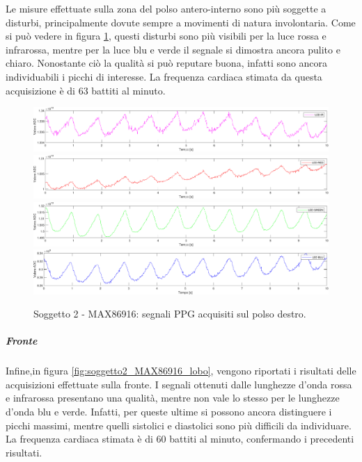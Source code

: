 Le misure effettuate sulla zona del polso antero-interno sono più soggette a disturbi, principalmente dovute sempre a movimenti di natura involontaria. Come si può vedere in figura \ref{fig:soggetto2_MAX86916_polso}, questi disturbi sono più visibili per la luce rossa e infrarossa, mentre per la luce blu e verde il segnale si dimostra ancora pulito e chiaro. Nonostante ciò la qualità si può reputare buona, infatti sono ancora individuabili i picchi di interesse. La frequenza cardiaca stimata da questa acquisizione è di 63 battiti al minuto.
\begin{figure}[h]
	\centering
	\includegraphics[width=1\linewidth]{ImageFiles/Misure Preliminari/Soggetto 2/max86916/polso_inferiore_ired}
	\includegraphics[width=1\linewidth]{ImageFiles/Misure Preliminari/Soggetto 2/max86916/polso_inferiore_red}
	\includegraphics[width=1\linewidth]{ImageFiles/Misure Preliminari/Soggetto 2/max86916/polso_inferiore_green}
	\includegraphics[width=1\linewidth]{ImageFiles/Misure Preliminari/Soggetto 2/max86916/polso_inferiore_blu}
	\caption{Soggetto 2 - MAX86916: segnali PPG acquisiti sul polso destro.}
	\label{fig:soggetto2_MAX86916_polso}
\end{figure}

\clearpage

\subparagraph{Fronte}

Infine,in figura \ref{fig:soggetto2_MAX86916_lobo}, vengono riportati i risultati delle acquisizioni effettuate sulla fronte. I segnali ottenuti dalle lunghezze d'onda rossa e infrarossa presentano una qualità, mentre non vale lo stesso per le lunghezze d'onda blu e verde. Infatti, per queste ultime si possono ancora distinguere i picchi massimi, mentre quelli sistolici e diastolici sono più difficili da individuare. La frequenza cardiaca stimata è di 60 battiti al minuto, confermando i precedenti risultati.

